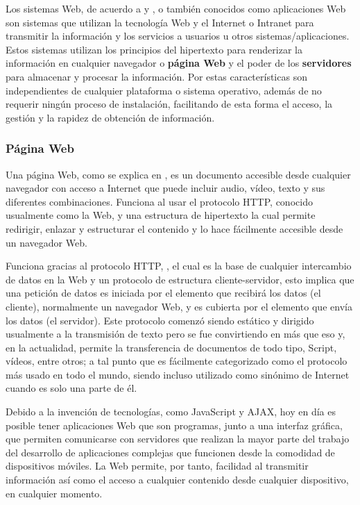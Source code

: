 Los sistemas Web, de acuerdo a \textcite{SistWeb1} y \textcite{wiki:systemWeb}, o
también conocidos como aplicaciones Web son sistemas que
utilizan la tecnología Web y el Internet o Intranet para transmitir la
información y los
servicios a usuarios u otros sistemas/aplicaciones. Estos sistemas utilizan los
principios del hipertexto para renderizar la información en cualquier
navegador o \textbf{página Web} y el poder de los \textbf{servidores} para
almacenar y procesar la información. Por estas características son independientes
de cualquier plataforma o sistema operativo, además de  no requerir ningún
proceso de instalación, facilitando de esta forma el acceso, la gestión y la
rapidez de obtención de información.



\subsubsection*{Página Web}
Una página Web, como se explica en \textcite{WebpageMozila},  es un documento
accesible desde cualquier navegador con acceso
a Internet que puede incluir audio, vídeo, texto y sus diferentes
combinaciones.
Funciona al usar el protocolo HTTP, conocido usualmente como la Web, y una
estructura de hipertexto la cual permite redirigir, enlazar y estructurar el
contenido y lo hace fácilmente accesible desde un navegador Web.

Funciona gracias al protocolo HTTP, ,
el cual es la base de cualquier intercambio de datos en la Web y un protocolo
de estructura cliente-servidor, esto implica que una petición de datos es
iniciada por el elemento que recibirá los datos (el cliente), normalmente un
navegador Web, y es cubierta por el elemento que envía los datos (el servidor).
Este protocolo comenzó siendo estático y dirigido usualmente a la transmisión de
texto pero se fue convirtiendo en más que eso y, en la actualidad, permite la
transferencia de documentos de todo tipo, Script, vídeos, entre otros; a tal
punto que es fácilmente categorizado como el protocolo más usado en todo el
mundo, siendo incluso utilizado como sinónimo de Internet cuando es solo una
parte de él.

Debido a la invención de tecnologías, como JavaScript y AJAX, hoy en día es
posible tener aplicaciones Web que son programas, junto a una interfaz gráfica,
que permiten comunicarse con servidores que realizan la mayor parte del trabajo
del desarrollo de aplicaciones complejas que funcionen desde la
comodidad de dispositivos móviles. La Web permite, por tanto, facilidad al
transmitir información así como el acceso a cualquier contenido desde
cualquier dispositivo, en cualquier momento.


